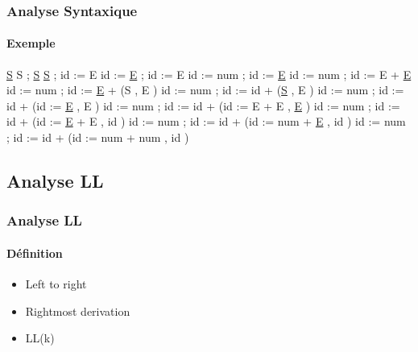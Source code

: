 \documentclass{beamer}
\begin{document}
\begin{frame}\frametitle{Analyse Syntaxique}\framesubtitle{Exemple}

	\newline\newline
	\underline{S}\newline
	S ; \underline{S}\newline
	\underline{S} ; id := E\newline
	id := \underline{E} ; id := E\newline
	id := num ; id := \underline{E}\newline
	id := num ; id := E + \underline{E}\newline
	id := num ; id := \underline{E} + (S , E )\newline
	id := num ; id := id + (\underline{S} , E )\newline
	id := num ; id := id + (id := \underline{E} , E )\newline
	id := num ; id := id + (id := E + E , \underline{E} )\newline
	id := num ; id := id + (id := \underline{E} + E , id )\newline
	id := num ; id := id + (id := num + \underline{E} , id )\newline
	id := num ; id := id + (id := num + num , id )\newline

\end{frame}

\subsection{Analyse LL}

\begin{frame}\frametitle{Analyse LL}\framesubtitle{Définition}

	\begin{itemize}
				\item Left to right\newline
				\item Rightmost derivation\newline
				\item LL(k)\newline
	\end{itemize}

\end{frame}
\end{document}
